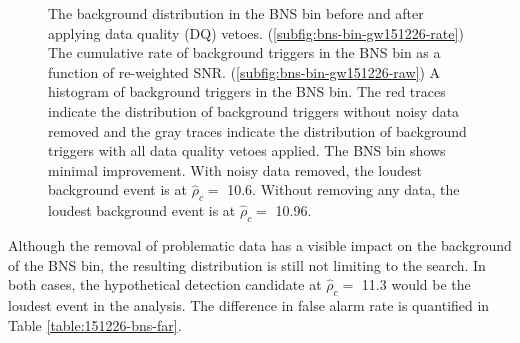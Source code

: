 \begin{figure}[!ht]%
\centering
  \caption[BNS bin histograms - GW151226 analysis]{The background distribution in the BNS bin before and after applying data quality (DQ) vetoes. %
           (\ref{subfig:bns-bin-gw151226-rate}) The cumulative rate of background triggers %
           in the BNS bin as a function of re-weighted SNR. %
           (\ref{subfig:bns-bin-gw151226-raw}) A histogram of background triggers %
           in the BNS bin. %
           The red traces indicate the %
           distribution of background triggers without noisy data removed %
           and the gray traces indicate the distribution %
           of background triggers with all data quality vetoes applied. %
           The BNS bin shows minimal improvement. %
           With noisy data removed, the loudest background event is at $\hat{\rho}_{c} =$ 10.6. %
           Without removing any data, the loudest background event is at $\hat{\rho}_{c} =$ 10.96. %
          }
\label{fig:bns-bin-far-GW151226}
\end{figure}

Although the removal of problematic data has a visible impact on the background of the BNS bin,
the resulting distribution is still not limiting to the search. In both cases, the
hypothetical detection candidate at $\hat{\rho}_{c} =$ 11.3 would be the loudest event in the analysis.
The difference in false alarm rate is quantified in Table \ref{table:151226-bns-far}.

